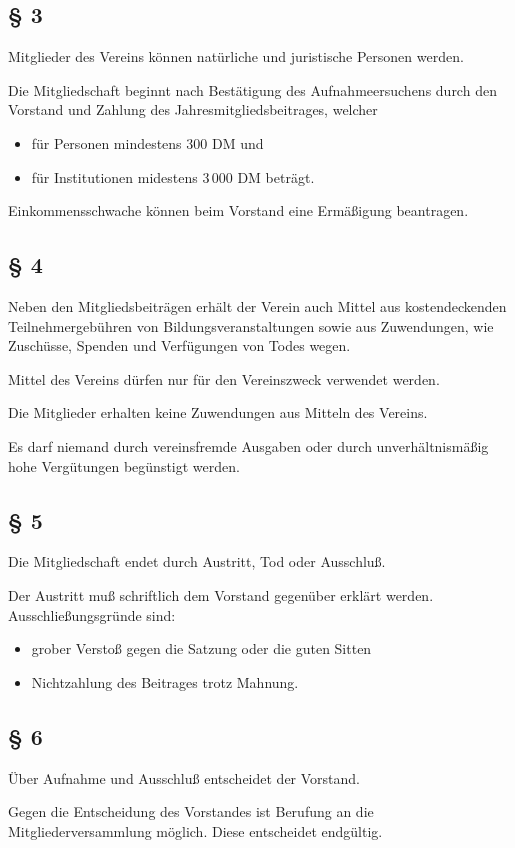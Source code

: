\documentclass[11pt,a4paper]{article}
\begin{document}
\subsection*{§ 3}
Mitglieder des Vereins können natürliche und juristische Personen werden.

Die Mitgliedschaft beginnt nach Bestätigung des Aufnahmeersuchens durch den
Vorstand und Zahlung des Jahresmitgliedsbeitrages, welcher 
\begin{itemize}
\item für Personen mindestens 300 DM und
\item für Institutionen midestens 3\,000 DM beträgt.
\end{itemize}
Einkommensschwache können beim Vorstand eine Ermäßigung beantragen.
\subsection*{§ 4}
Neben den Mitgliedsbeiträgen erhält der Verein auch Mittel aus kostendeckenden
Teilnehmergebühren von Bildungsveranstaltungen sowie aus Zuwendungen, wie
Zuschüsse, Spenden und Verfügungen von Todes wegen.

Mittel des Vereins dürfen nur für den Vereinszweck verwendet werden.

Die Mitglieder erhalten keine Zuwendungen aus Mitteln des Vereins.

Es darf niemand durch vereinsfremde Ausgaben oder durch unverhältnismäßig hohe
Vergü\-tun\-gen begünstigt werden.
\subsection*{§ 5}
Die Mitgliedschaft endet durch Austritt, Tod oder Ausschluß.

Der Austritt muß schriftlich dem Vorstand gegenüber erklärt werden.
Ausschließungsgründe sind:
\begin{itemize}
\item grober Verstoß gegen die Satzung oder die guten Sitten
\item Nichtzahlung des Beitrages trotz Mahnung.
\end{itemize}
\subsection*{§ 6}
Über Aufnahme und Ausschluß entscheidet der Vorstand.

Gegen die Entscheidung des Vorstandes ist Berufung an die
Mitgliederversammlung möglich. Diese entscheidet endgültig.
\end{document}
